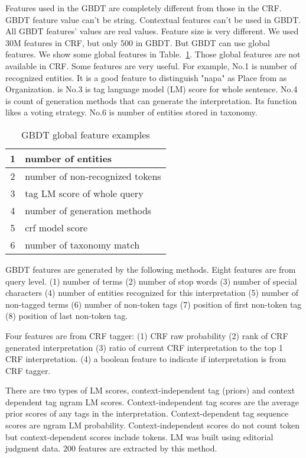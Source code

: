 \documentclass[11pt]{article}
\begin{document}
Features used in the GBDT are completely different from those in the CRF. GBDT feature value can't be string. Contextual features can't be used in GBDT. All GBDT features' values are real values. Feature size is very different. We used 30M features in CRF, but only 500 in GBDT. But GBDT can use global features.  We show some global features in Table.~\ref{table:features}. Those global features are not available in CRF. Some features are very useful. For example, No.1 is number of recognized entities. It is a good feature to  distinguish "napa" as Place from as Organization. is No.3 is tag language model (LM) score for whole sentence. No.4 is count of generation methods that can generate the interpretation. Its function likes a voting strategy.   No.6 is number of entities stored in taxonomy.
\begin{table}
\begin{center}
\begin{tabular}{|c|l|}\hline
 1 & number of entities \\ \hline
 2 & number of non-recognized tokens \\ \hline
 3 & tag LM score of whole query \\ \hline
 4 & number of generation methods \\ \hline
 5 & crf model score \\ \hline
 6 & number of taxonomy match \\ \hline
\end{tabular}
\caption{GBDT global feature examples}
\label{table:features}
\end{center}
\end{table}

GBDT features are generated by the following methods.
Eight features are from query level. (1) number of terms (2) number of stop words (3) number of special characters (4) number of entities recognized for this interpretation (5) number of non-tagged terms (6) number of non-token tags (7) position of first non-token tag (8) position of last non-token tag.

Four features are from CRF tagger: (1) CRF raw probability (2) rank of CRF generated interpretation (3) ratio of current CRF interpretation to the top 1 CRF interpretation. (4) a boolean feature to indicate if interpretation is from CRF tagger.

There are two types of LM scores, context-independent tag (priors) and context dependent tag ngram LM scores. Context-independent tag scores are the average prior scores of any tags in the interpretation. Context-dependent tag sequence scores are ngram LM probability. Context-independent scores do not count token but context-dependent scores include tokens.
LM was built using editorial judgment data. 200 features are extracted by this method.
\end{document}
